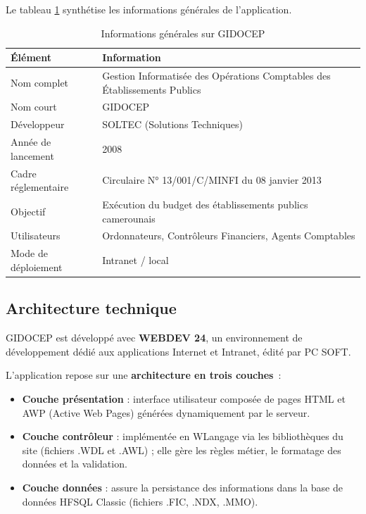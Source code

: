 \documentclass[12pt,a4paper,oneside]{report}
\begin{document}
Le tableau \ref{tab:gidocep_info} synthétise les informations générales de l'application.

\begin{table}[H]
	\centering\small
	\caption{Informations générales sur GIDOCEP}
	\label{tab:gidocep_info}
	\begin{tabularx}{\textwidth}{p{4cm}X}
		\toprule
		\rowcolor{theadcolor}
		\color{white}\textbf{Élément} &
		\color{white}\textbf{Information} \\
		\midrule
		Nom complet & Gestion Informatisée des Opérations Comptables des Établissements Publics \\
		Nom court & GIDOCEP \\
		Développeur & SOLTEC (Solutions Techniques) \\
		Année de lancement & 2008 \\
		Cadre réglementaire & Circulaire N° 13/001/C/MINFI du 08 janvier 2013 \\
		Objectif & Exécution du budget des établissements publics camerounais \\
		Utilisateurs & Ordonnateurs, Contrôleurs Financiers, Agents Comptables \\
		Mode de déploiement & Intranet / local \\
		\bottomrule
	\end{tabularx}
\end{table}

\subsection{Architecture technique}

GIDOCEP est développé avec \textbf{WEBDEV 24}, un environnement de développement dédié aux applications Internet et Intranet, édité par PC SOFT.

L'application repose sur une \textbf{architecture en trois couches}~:

\begin{itemize}[label={\color{gold}}, leftmargin=*]
	\item \textbf{Couche présentation} : interface utilisateur composée de pages HTML et AWP (Active Web Pages) générées dynamiquement par le serveur.
	\item \textbf{Couche contrôleur} : implémentée en WLangage via les bibliothèques du site (fichiers .WDL et .AWL) ; elle gère les règles métier, le formatage des données et la validation.
	\item \textbf{Couche données} : assure la persistance des informations dans la base de données HFSQL Classic (fichiers .FIC, .NDX, .MMO).
\end{itemize}
\end{document}

